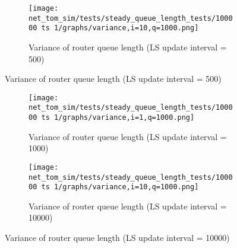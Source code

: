 \begin{appendices}
\begin{figure}[H]
\begin{subfigure}[b]{0.475\textwidth}
            \texttt{[image: net\_tom\_sim/tests/steady\_queue\_length\_tests/100000 ts 1/graphs/variance,i=10,q=1000.png]}
            \caption[]{Variance of router queue length (LS update interval = 500)}
            \label{fig:qvar-500}
        \end{subfigure}
    \end{figure}
    \begin{figure}[H]\ContinuedFloat
        \begin{subfigure}{0.475\textwidth}
            \texttt{[image: net\_tom\_sim/tests/steady\_queue\_length\_tests/100000 ts 1/graphs/variance,i=1,q=1000.png]}
            \caption[]{Variance of router queue length (LS update interval = 1000)}
            \label{fig:qvar-1000}
        \end{subfigure}
        \hfill
        \begin{subfigure}[H]{0.475\textwidth}
            \texttt{[image: net\_tom\_sim/tests/steady\_queue\_length\_tests/100000 ts 1/graphs/variance,i=10,q=1000.png]}
            \caption[]{Variance of router queue length (LS update interval = 10000)}
            \label{fig:qvar-10000}
        \end{subfigure}
    \end{figure}
\end{appendices}
